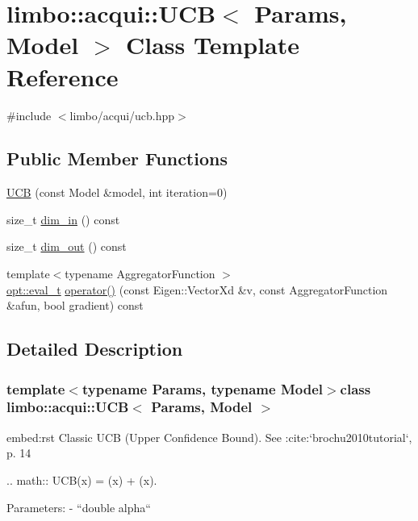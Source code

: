 \hypertarget{classlimbo_1_1acqui_1_1_u_c_b}{}\section{limbo\+:\+:acqui\+:\+:U\+C\+B$<$ Params, Model $>$ Class Template Reference}
\label{classlimbo_1_1acqui_1_1_u_c_b}


{\ttfamily \#include $<$limbo/acqui/ucb.\+hpp$>$}

\subsection*{Public Member Functions}
\begin{DoxyCompactItemize}
\item 
\hyperlink{classlimbo_1_1acqui_1_1_u_c_b_ae4410ba09273ea88b36130ea916fcc60}{U\+C\+B} (const Model \&model, int iteration=0)
\item 
size\+\_\+t \hyperlink{classlimbo_1_1acqui_1_1_u_c_b_ab922a11b709216f35db6ee83fcb86ed5}{dim\+\_\+in} () const 
\item 
size\+\_\+t \hyperlink{classlimbo_1_1acqui_1_1_u_c_b_aa6870bb7764a6f729db39f86eb005d54}{dim\+\_\+out} () const 
\item 
{\footnotesize template$<$typename Aggregator\+Function $>$ }\\\hyperlink{group__opt__tools_ga362b55973a38ac71f27a06f9d9c14f24}{opt\+::eval\+\_\+t} \hyperlink{classlimbo_1_1acqui_1_1_u_c_b_a029c5489c29e294e50e0d83a203c9572}{operator()} (const Eigen\+::\+Vector\+Xd \&v, const Aggregator\+Function \&afun, bool gradient) const 
\end{DoxyCompactItemize}


\subsection{Detailed Description}
\subsubsection*{template$<$typename Params, typename Model$>$class limbo\+::acqui\+::\+U\+C\+B$<$ Params, Model $>$}

\begin{DoxyVerb}embed:rst
Classic UCB (Upper Confidence Bound). See :cite:`brochu2010tutorial`, p. 14

  .. math::
    UCB(x) = \mu(x) + \alpha \sigma(x).

Parameters:
  - ``double alpha``
\end{DoxyVerb}
 

